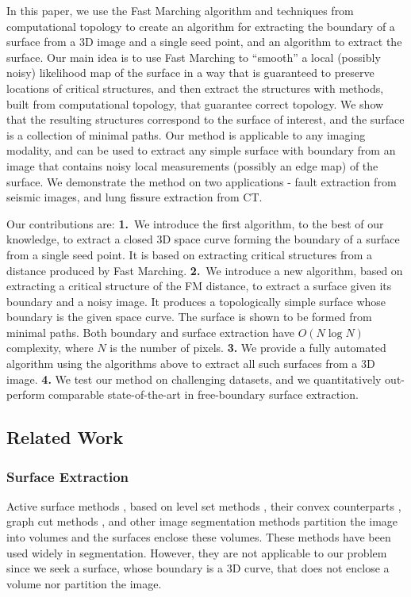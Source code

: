 \documentclass[10pt,journal,compsoc]{IEEEtran}
\newcommand{\comment}[1]{ }
\begin{document}
In this paper, we use the Fast Marching algorithm and techniques from
computational topology to create an algorithm for extracting the
boundary of a surface from a 3D image and a single seed point, and an
algorithm to extract the surface.  Our main idea is to use Fast
Marching to ``smooth'' a local (possibly noisy) likelihood map of the
surface in a way that is guaranteed to preserve locations of critical
structures, and then extract the structures with methods, built from
computational topology, that guarantee correct topology. We show that
the resulting structures correspond to the surface of interest, and
the surface is a collection of minimal paths. Our method is applicable
to any imaging modality, and can be used to extract any simple surface
with boundary from an image that contains noisy local measurements
(possibly an edge map) of the surface. We demonstrate the method on
two applications - fault extraction from seismic images, and lung
fissure extraction from CT.

\comment{
We validate our
algorithm on seismic images for extracting fault surfaces, which form
surfaces with free-boundaries. This has wide ranging applications in
the oil industry \cite{hale2012fault}. Although we validate our method
with such images, 
}

Our contributions are: {\bf 1.}~We introduce the first algorithm, to
the best of our knowledge, to extract a closed 3D space curve forming
the boundary of a surface from a single seed point.  It is based on
extracting critical structures from a distance produced by Fast
Marching. {\bf 2.}~We introduce a new algorithm, based on extracting a
critical structure of the FM distance, to extract a surface given its
boundary and a noisy image. It produces a topologically simple surface
whose boundary is the given space curve. The surface is shown to be
formed from minimal paths. Both boundary and surface extraction have
$O(N \log N)$ complexity, where $N$ is the number of pixels. {\bf 3.}
We provide a fully automated algorithm using the algorithms above to
extract all such surfaces from a 3D image. {\bf 4.} We test our method
on challenging datasets, and we quantitatively out-perform comparable
state-of-the-art in free-boundary surface extraction.


\subsection{ Related Work}

\subsubsection{Surface Extraction}
Active surface methods
\cite{caselles1997geodesic,yezzi1997geometric,chan2001active}, based
on level set methods \cite{osher1988fronts}, their convex counterparts
\cite{pock2008convex}, graph cut methods
\cite{boykov2001interactive,rother2004grabcut}, and other image
segmentation methods partition the image into volumes and the surfaces
enclose these volumes. These methods have been used widely in
segmentation. However, they are not applicable to our problem since we
seek a surface, whose boundary is a 3D curve, that does not enclose a
volume nor partition the image.
\end{document}

